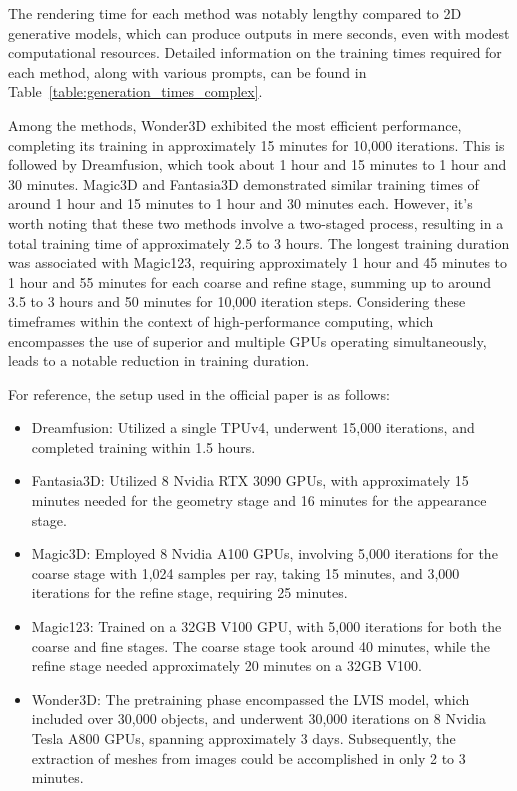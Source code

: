 The rendering time for each method was notably lengthy compared to 2D generative models, which can produce outputs in mere seconds, even with modest computational resources. Detailed information on the training times required for each method, along with various prompts, can be found in Table~\ref{table:generation_times_complex}.

Among the methods, Wonder3D exhibited the most efficient performance, completing its training in approximately 15 minutes for 10,000 iterations. This is followed by Dreamfusion, which took about 1 hour and 15 minutes to 1 hour and 30 minutes. Magic3D and Fantasia3D demonstrated similar training times of around 1 hour and 15 minutes to 1 hour and 30 minutes each. However, it's worth noting that these two methods involve a two-staged process, resulting in a total training time of approximately 2.5 to 3 hours. The longest training duration was associated with Magic123, requiring approximately 1 hour and 45 minutes to 1 hour and 55 minutes for each coarse and refine stage, summing up to around 3.5 to 3 hours and 50 minutes for 10,000 iteration steps. 
Considering these timeframes within the context of high-performance computing, which encompasses the use of superior and multiple GPUs operating simultaneously, leads to a notable reduction in training duration.

For reference, the setup used in the official paper is as follows:

\begin{itemize}
    \item Dreamfusion: Utilized a single TPUv4, underwent 15,000 iterations, and completed training within 1.5 hours.
    
    \item Fantasia3D\@: Utilized 8 Nvidia RTX 3090 GPUs, with approximately 15 minutes needed for the geometry stage and 16 minutes for the appearance stage.
    
    \item Magic3D\@: Employed 8 Nvidia A100 GPUs, involving 5,000 iterations for the coarse stage with 1,024 samples per ray, taking 15 minutes, and 3,000 iterations for the refine stage, requiring 25 minutes.
    
    \item Magic123: Trained on a 32GB V100 GPU, with 5,000 iterations for both the coarse and fine stages. The coarse stage took around 40 minutes, while the refine stage needed approximately 20 minutes on a 32GB V100.
    
    \item Wonder3D\@: The pretraining phase encompassed the LVIS model, which included over 30,000 objects, and underwent 30,000 iterations on 8 Nvidia Tesla A800 GPUs, spanning approximately 3 days. Subsequently, the extraction of meshes from images could be accomplished in only 2 to 3 minutes.
\end{itemize}


